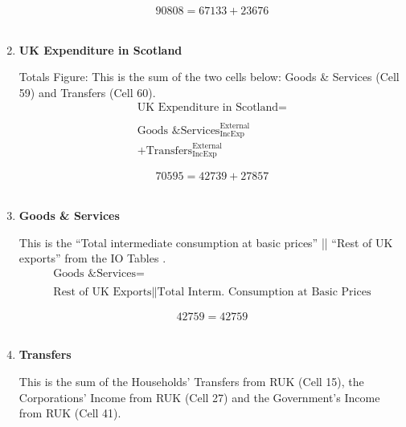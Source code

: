 \begin{enumerate}
\begin{equation} \nonumber
90808 = 67133+23676
\end{equation}\\



\pagebreak

\item \textbf {UK Expenditure in Scotland}

Totals Figure: This is the sum of the two cells below: Goods \& Services (Cell 59) and Transfers (Cell 60).\\

\begin{equation}
\begin{split}
\text{UK Expenditure in Scotland} =  \\ \\
\text{Goods \& Services}^\text{External}_\text{IncExp}\\
+\text{Transfers}^\text{External}_\text{IncExp}
\end{split} \label{eq:2.5.62}
\end{equation}

\begin{equation} \nonumber
70595 = 42739+27857
\end{equation}\\


\item \textbf {Goods \& Services}

This is the ``Total intermediate consumption at basic prices'' || ``Rest of UK exports'' from the IO Tables \cite{ScotGov2013a}.\\

\begin{equation}
\begin{split}
\text{Goods \& Services} =  \\ \\
\text{Rest of UK Exports}\|\text{Total Interm. Consumption at Basic Prices}
\end{split} \label{eq:2.5.63}
\end{equation}

\begin{equation} \nonumber
42759 = 42759
\end{equation}\\


\item \textbf {Transfers}

This is the sum of the Households' Transfers from RUK (Cell 15), the Corporations' Income from RUK (Cell 27) and the Government's Income from RUK (Cell 41).


\end{enumerate}
